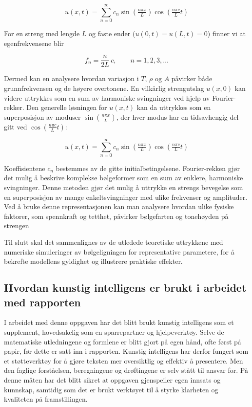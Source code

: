 \begin{equation*}
    u(x,t) = \sum_{n=0}^{\infty} c_n 
    \sin\!\left(\tfrac{n\pi x}{L}\right)
    \cos\!\left(\tfrac{n\pi c}{L}t\right)
\end{equation*}

For en streng med lengde $L$ og faste ender ($u(0,t)=u(L,t)=0$) finner vi at egenfrekvensene blir

\begin{equation*}
  f_n = \frac{n}{2L}\,c, \qquad n=1,2,3,\dots \label{egenfrekvensene}
\end{equation*}
\clearpage

Dermed kan en analysere hvordan variasjon i $T$, $\rho$ og $A$ påvirker både grunnfrekvensen og de høyere overtonene.  
En vilkårlig strengutslag $u(x,0)$ kan videre uttrykkes som en sum av harmoniske svingninger ved hjelp av Fourier-rekker.  
Den generelle løsningen for $u(x,t)$ kan da uttrykkes som en superposisjon av moduser 
$\sin\!\left(\tfrac{n\pi x}{L}\right)$, der hver modus har en tidsavhengig del gitt ved 
$\cos\!\left(\tfrac{n\pi c}{L}t\right)$:

\begin{equation*}
    u(x,t) = \sum_{n=0}^{\infty} c_n 
    \sin\!\left(\tfrac{n\pi x}{L}\right)
    \cos\!\left(\tfrac{n\pi c}{L}t\right)
\end{equation*}

Koeffisientene $c_n$ bestemmes av de gitte initialbetingelsene.  
Fourier-rekken gjør det mulig å beskrive komplekse bølgeformer som en sum av enklere, harmoniske svingninger.  
Denne metoden gjør det mulig å uttrykke en strengs bevegelse som en superposisjon av mange enkeltsvingninger med ulike frekvenser og amplituder.  
Ved å bruke denne representasjonen kan man analysere hvordan ulike fysiske faktorer, som spennkraft og tetthet, påvirker bølgefarten og tonehøyden på strengen \parencite{libretextsWave}

Til slutt skal det sammenlignes av de utledede teoretiske uttrykkene med numeriske simuleringer 
av bølgeligningen for representative parametere, for å bekrefte modellens gyldighet og illustrere praktiske effekter.

\subsection{Hvordan kunstig intelligens er brukt i arbeidet med rapporten}
I arbeidet med denne oppgaven har det blitt brukt kunstig intelligens som et supplement, hovedsakelig som en sparrepartner og hjelpeverktøy.
Selve de matematiske utledningene og formlene er blitt gjort på egen hånd, ofte først på papir, før dette er satt inn i rapporten. 
Kunstig intelligens har derfor fungert som et støtteverktøy for å gjøre teksten mer oversiktlig og effektiv å presentere. Men den faglige forståelsen, beregningene og drøftingene 
er selv stått til ansvar for. På denne måten har det blitt sikret at oppgaven gjenspeiler egen innsats og kunnskap, samtidig som det er brukt 
verktøyet til å styrke klarheten og kvaliteten på framstillingen.